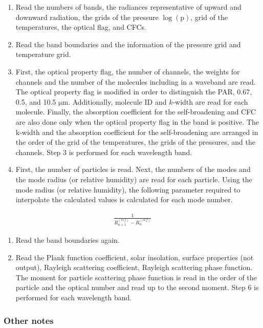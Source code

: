 \begin{enumerate}
\def\labelenumi{\arabic{enumi}.}
\item
  Read the numbers of bands, the radiances representative of upward and
  downward radiation, the grids of the pressure \(\log (\mathrm{p})\),
  grid of the temperatures, the optical flag, and CFCs.
\item
  Read the band boundaries and the information of the pressure grid and
  temperature grid.
\item
  First, the optical property flag, the number of channels, the weights
  for channels and the number of the molecules including in a waveband
  are read. The optical property flag is modified in order to
  distinguish the PAR, 0.67, 0.5, and 10.5 \(\mathrm{{\mu}m}\).
  Additionally, molecule ID and \(k\)-width are read for each molecule.
  Finally, the absorption coefficient for the self-broadening and CFC
  are also done only when the optical property flag in the band is
  positive. The k-width and the absorption coefficient for the
  self-broadening are arranged in the order of the grid of the
  temperatures, the grids of the pressures, and the channels. Step 3 is
  performed for each wavelength band.
\item
  First, the number of particles is read. Next, the numbers of the modes
  and the mode radius (or relative humidity) are read for each particle.
  Using the mode radius (or relative humidity), the following parameter
  required to interpolate the calculated values is calculated for each
  mode number.
\end{enumerate}

\begin{eqnarray}
   \frac{1}{R_{n+1}^{(r e f)}-R_{n}^{(r e f)}}
\end{eqnarray}

\begin{enumerate}
\def\labelenumi{\arabic{enumi}.}
\setcounter{enumi}{4}
\item
  Read the band boundaries again.
\item
  Read the Plank function coefficient, solar insolation, surface
  properties (not output), Rayleigh scattering coefficient, Rayleigh
  scattering phase function. The moment for particle scattering phase
  function is read in the order of the particle and the optical number
  and read up to the second moment. Step 6 is performed for each
  wavelength band.
\end{enumerate}

\hypertarget{other-notes}{%
\subsubsection{Other notes}\label{other-notes}}

